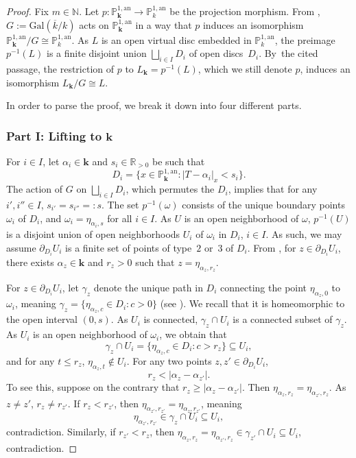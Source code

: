 \documentclass[10pt]{amsart}
\newcommand{\loccit}{the cited passage}
\newcommand{\bbk}{{\boldsymbol{k}}}%
\theoremstyle{definition}
\begin{document}
\begin{proof}
Fix $m \in \mathbb{N}$. Let $p: \mathbb{P}_{\bbk}^{1, \mathrm{an}} \to \mathbb{P}_k^{1, \mathrm{an}}$ be the projection morphism. From \cite[Cor.\,1.3.6]{Ber90}, $G:=\mathrm{Gal}(\overline{k}/k)$ acts on $\mathbb{P}^{1, \mathrm{an}}_{\bbk}$ in a way that $p$ induces an isomorphism $\mathbb{P}_{\bbk}^{1, \mathrm{an}}/G \cong \mathbb{P}_k^{1, \mathrm{an}}$. As $L$ is an open virtual disc embedded in $\mathbb{P}_k^{1, \mathrm{an}}$, the preimage $p^{-1}(L)$ is a finite disjoint union $\bigsqcup_{i \in I} D_i$ of open discs~$D_i$. By~\loccit, the restriction of $p$ to $L_{\bbk}=p^{-1}(L)$, which we still denote $p$, induces an isomorphism $L_{\bbk}/G \cong L$.

In order to parse the proof, we break it down into four different parts.

\subsubsection*{Part I: Lifting to $\bbk$}
For $i \in I$, let $\alpha_i \in \bbk$ and $s_i \in \mathbb{R}_{>0}$ be such that
\[
D_i=\{x \in \mathbb{P}_{\bbk}^{1, \mathrm{an}} :|T-\alpha_i|_x<s_i\}.
\]
The action of $G$ on $\bigsqcup_{i \in I}D_i$, which permutes the $D_i$, implies that for any $i', i'' \in I$, $s_{i'}=s_{i''}=:s$. The set $p^{-1}(\omega)$ consists of the unique boundary points $\omega_i$ of $D_i$, and $\omega_i=\eta_{\alpha_i, s}$ for all $i \in I$.
As $U$ is an open neighborhood of $\omega$, $p^{-1}(U)$ is a disjoint union of open neighborhoods $U_i$ of $\omega_i$ in $D_i$, $i \in I$. As such, we may assume $\partial_{D_i}{U_i}$ is a finite set of points of type~$2$ or~3 of $D_i$.
From \cite[Prop.\,2.3]{une}, for $z \in \partial_{D_i}{U_i}$, there exists $\alpha_{z} \in \bbk$ and $r_{z}>0$ such that $z=\eta_{\alpha_z, r_z}$.

For $z \in \partial_{D_{i}} U_{i}$, let $\gamma_z$ denote the unique path in $D_{i}$ connecting the point $\eta_{\alpha_z, 0}$ to~$\omega_{i}$, meaning $\gamma_z=\{\eta_{\alpha_z, c} \in D_{i}: c>0\}$ (see \cite[Rem.\,1.8.26]{doktoratura}). We recall that it is homeomorphic to the open interval $(0, s)$. As $U_{i}$ is connected, $\gamma_z \cap U_{i}$ is a connected subset of $\gamma_z$. As $U_{i}$ is an open neighborhood of $\omega_{i}$, we obtain that
\[
\gamma_z \cap U_i=\{\eta_{\alpha_z, c} \in D_{i}: c>r_z\} \subseteq U_{i},
\]
and for any $t \leqslant r_z$, $\eta_{\alpha_z, t} \notin U_{i}$. For any two points $z, z' \in \partial_{D_i} U_i$,
\begin{equation} \label{5.3.1}
r_z < |\alpha_z-\alpha_{z'}|.
\end{equation}
To see this, suppose on the contrary that $r_z \geqslant |\alpha_z-\alpha_{z'}|$. Then $\eta_{\alpha_z, r_z}=\eta_{\alpha_{z'}, r_z}$. As~$z \neq z'$, $r_z \neq r_{z'}$. If $r_{z}< r_{z'}$, then $\eta_{\alpha_{z'}, r_{z'}}=\eta_{\alpha_z, r_{z'}}$, meaning
\[
\eta_{\alpha_{z'}, r_{z'}} \in \gamma_z \cap U_i \subseteq U_i,
\]
contradiction. Similarly, if $r_{z'}< r_{z}$, then $\eta_{\alpha_z, r_z}=\eta_{\alpha_{z'}, r_z} \in \gamma_{z'} \cap U_i \subseteq U_i$, contradiction.


\end{proof}
\end{document}
